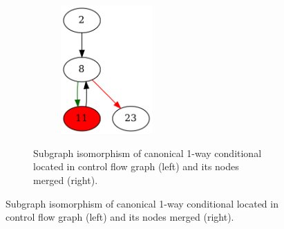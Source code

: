 \documentclass[aspectratio=1610]{beamer}
\begin{document}
\begin{frame}
\begin{figure}[htbp]
\begin{subfigure}[b]{0.65\textwidth}
\begin{subfigure}[ht]{0.40\textwidth}
			\end{subfigure}
			\quad
			\begin{subfigure}[ht]{0.40\textwidth}
				\centering
				\includegraphics[width=0.5\textwidth]{inc/methods/hammock/main_0002b.png}
			\end{subfigure}
			\caption{Subgraph isomorphism of canonical 1-way conditional located in control flow graph (left) and its nodes merged (right).}
		\end{subfigure}
	\end{figure}
\end{frame}


\end{document}
